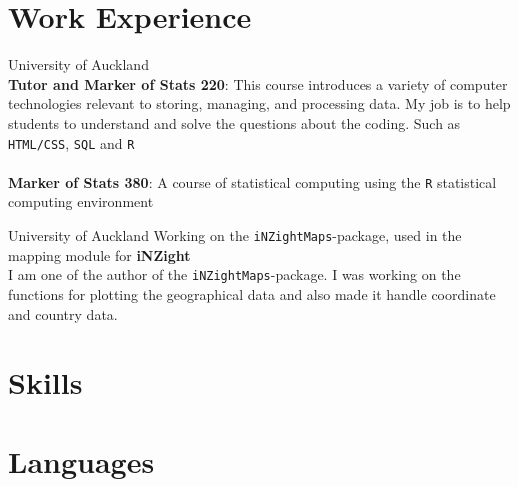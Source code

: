\documentclass[11pt,a4paper, twoside]{moderncv} %
\begin{document}
\section{Work Experience}
  {University of Auckland}{}{}{
	~\\
	\textbf{Tutor and Marker of Stats 220}: This course introduces a variety of computer technologies relevant to storing, managing, and processing data. My job is to help students to understand and solve the questions about the coding. Such as \texttt{HTML/CSS}, \texttt{SQL} and \texttt{R} \\~\\
	\textbf{Marker of Stats 380}: A course of statistical computing using the \texttt{R} statistical computing environment\\}

  {University of Auckland}{}{}{
	Working on the \texttt{iNZightMaps}-package, used in the mapping module for \textbf{iNZight}\\
	I am one of the author of the \texttt{iNZightMaps}-package. I was working on the functions for plotting the geographical data and also made it handle coordinate and country data.
}



\section{Skills}




\section{Languages}
\end{document}

